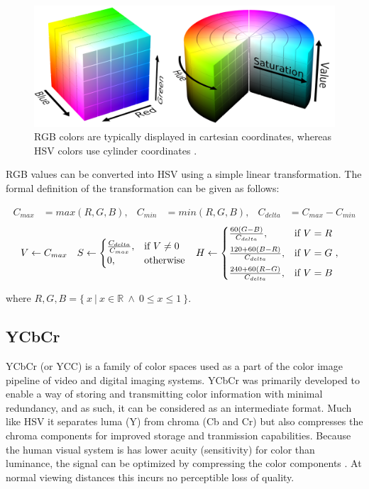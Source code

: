\documentclass[thesis.tex]{subfiles}
\begin{document}
\begin{figure}[ht]
\centering \includegraphics[width=\textwidth]{images/rgb_hsv}
\caption{RGB colors are typically displayed in cartesian coordinates, whereas HSV colors use cylinder coordinates \cite{hsv_cylinder} \cite{rgb_cube}.\label{figure:rgb_hsv}}
\end{figure}

RGB values can be converted into HSV using a simple linear transformation. The formal definition of the transformation can be given as follows:

\begin{align*}
C_{max}&=max(R, G, B),	&	C_{min}&=min(R, G, B),	&	C_{delta}&=C_{max}-C_{min}
\end{align*}
\begin{align*}
V &\leftarrow C_{max}	&
S &\leftarrow
	\begin{cases}
		\frac{C_{delta}}{C_{max}}, & \text{if $V\neq0$}\\
		0, & \text{otherwise}
	\end{cases}			&
H &\leftarrow
	\begin{cases}
		\frac{60(G-B)}{C_{delta}}, & \text{if $V=R$}\vspace{2mm}\\
		\frac{120+60(B-R)}{C_{delta}}, & \text{if $V=G$}\vspace{2mm}\\
		\frac{240+60(R-G)}{C_{delta}}, & \text{if $V=B$}
	\end{cases},
\end{align*}

\noindent where $R, G, B = \{\ x\ \vert\ x \in \mathbb R\ \wedge\ 0 \leq x \leq 1\ \}$.


\subsection{YCbCr}
YCbCr (or YCC) is a family of color spaces used as a part of the color image pipeline of video and digital imaging systems. YCbCr was primarily developed to enable a way of storing and transmitting color information with minimal redundancy, and as such, it can be considered as an intermediate format. Much like HSV it separates luma (Y) from chroma (Cb and Cr) but also compresses the chroma components for improved storage and tranmission capabilities. Because the human visual system is has lower acuity (sensitivity) for color than luminance, the signal can be optimized by compressing the color components \cite{color_vision}. At normal viewing distances this incurs no perceptible loss of quality.
\end{document}
